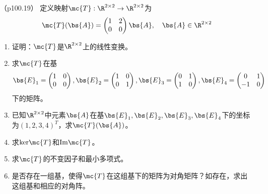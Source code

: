 \documentclass[12pt, a4paper, oneside, UTF8]{ctexbook}
\begin{document}
\begin{question}（p100.19）
定义映射$\mc{T}:\R^{2 \times 2} \rightarrow \R^{2\times 2}$为
\begin{align*}
    \mc{T}(\bs{A})=\begin{pmatrix}
        1 & 2\\
        0 & 0
    \end{pmatrix} \bs{A},\quad \bs{A} \in \R^{2 \times 2}
\end{align*}
\begin{enumerate}[label=(\arabic*)]
    \item 证明：$\mc{T}$是$\R^{2 \times 2}$上的线性变换。
    \item 求$\mc{T}$在基
    \begin{align*}
        \bs{E}_1=\begin{pmatrix}
            1  & 0\\
            0 & 0
        \end{pmatrix},\bs{E}_2=\begin{pmatrix}
            1  & 0\\
            0 & 1
        \end{pmatrix},\bs{E}_3=\begin{pmatrix}
            0  & 1\\
            1 & 0
        \end{pmatrix},\bs{E}_4=\begin{pmatrix}
            0  & 1\\
            -1 & 0
        \end{pmatrix}
    \end{align*}下的矩阵。
    \item 已知$\R^{2 \times 2}$中元素$\bs{A}$在基$\bs{E}_1,\bs{E}_2,\bs{E}_3,\bs{E}_4$下的坐标为$(1,2,3,4)^T$，求$\mc{T}(\bs{A})$。
    \item 求$\mathrm{ker}\mc{T}$和$\mathrm{Im}\mc{T}$。
    \item 求$\mc{T}$的不变因子和最小多项式。
    \item 是否存在一组基，使得$\mc{T}$在这组基下的矩阵为对角矩阵？如存在，求出这组基和相应的对角阵。
\end{enumerate}
\end{question}
\end{document}
